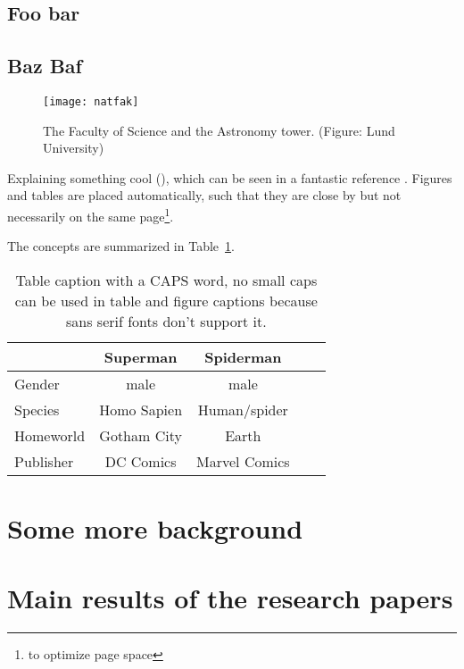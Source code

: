 \documentclass[11pt]{book}
\begin{document}
\subsection{Foo bar}

\blindtext[3]

\subsection{Baz Baf\label{sec:mainresults}}
\begin{figure}
  \texttt{[image: natfak]}
  \caption{The Faculty of Science and the Astronomy tower. (Figure: Lund University)\label{fig:cool}}
\end{figure}

Explaining something cool (), which can be seen in a fantastic reference
\parencite{bogdan2015}. Figures and tables are placed automatically, such that they are
close by but not necessarily on the same page\footnote{to optimize page space}.


The concepts are summarized in Table~\ref{tab:comparison}.

\begin{table}[htb]
  \caption{Table caption with a CAPS word, no small caps can be used in table and figure captions because sans serif fonts don't support it.\label{tab:comparison}}
  \centering
  \begin{tabular}{lcccc}
    \toprule
              & Superman    & Spiderman     \\
    \midrule
    Gender    & male        & male          \\
    Species   & Homo Sapien & Human/spider  \\
    Homeworld & Gotham City & Earth         \\
    \midrule
    Publisher & DC Comics   & Marvel Comics \\
    \bottomrule
  \end{tabular}
\end{table}

\section{Some more background}

\blindtext[10]

\section{Main results of the research papers}
\end{document}
